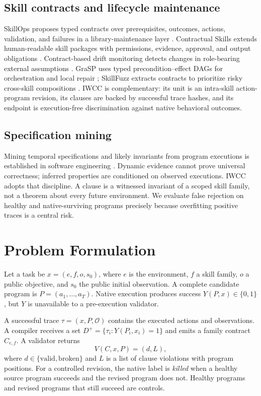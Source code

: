\documentclass[pdflatex,sn-basic]{sn-jnl}
\begin{document}
\subsection{Skill contracts and lifecycle maintenance}
SkillOps proposes typed contracts over prerequisites, outcomes, actions, validation, and failures in a library-maintenance layer \citep{pu2026skillops}. Contractual Skills extends human-readable skill packages with permissions, evidence, approval, and output obligations \citep{liu2026contractual}. Contract-based drift monitoring detects changes in role-bearing external assumptions \citep{fan2026drift}. GraSP uses typed precondition--effect DAGs for orchestration and local repair \citep{xia2026grasp}; SkillFuzz extracts contracts to prioritize risky cross-skill compositions \citep{hu2026skillfuzz}. IWCC is complementary: its unit is an intra-skill action-program revision, its clauses are backed by successful trace hashes, and its endpoint is execution-free discrimination against native behavioral outcomes.

\subsection{Specification mining}
Mining temporal specifications and likely invariants from program executions is established in software engineering \citep{ammons2002mining,ernst2007daikon,beschastnikh2011synoptic}. Dynamic evidence cannot prove universal correctness; inferred properties are conditioned on observed executions. IWCC adopts that discipline. A clause is a witnessed invariant of a scoped skill family, not a theorem about every future environment. We evaluate false rejection on healthy and native-surviving programs precisely because overfitting positive traces is a central risk.

\section{Problem Formulation}
Let a task be $x=(e,f,o,s_0)$, where $e$ is the environment, $f$ a skill family, $o$ a public objective, and $s_0$ the public initial observation. A complete candidate program is $P=(a_1,\ldots,a_T)$. Native execution produces success $Y(P,x)\in\{0,1\}$, but $Y$ is unavailable to a pre-execution validator.

A successful trace $\tau=(x,P,\mathcal{O})$ contains the executed actions and observations. A compiler receives a set $D^+=\{\tau_i:Y(P_i,x_i)=1\}$ and emits a family contract $C_{e,f}$. A validator returns
\[
V(C,x,P)=(d,L),
\]
where $d\in\{\mathrm{valid},\mathrm{broken}\}$ and $L$ is a list of clause violations with program positions. For a controlled revision, the native label is \emph{killed} when a healthy source program succeeds and the revised program does not. Healthy programs and revised programs that still succeed are controls.
\end{document}

